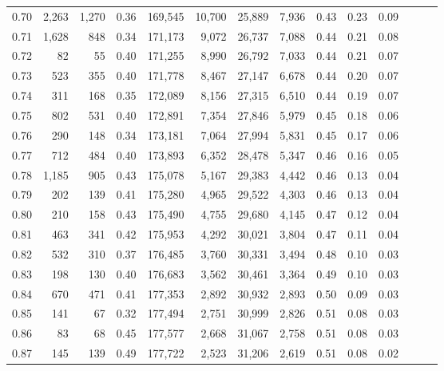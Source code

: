 \begin{tabular}{rrrrrrrrrrrrrr}
0.70 &   2,263 &  1,270 &  0.36 &  169,545 &   10,700 &  25,889 &   7,936 &  0.43 &  0.23 &      0.09 \\
0.71 &   1,628 &    848 &  0.34 &  171,173 &    9,072 &  26,737 &   7,088 &  0.44 &  0.21 &      0.08 \\
0.72 &      82 &     55 &  0.40 &  171,255 &    8,990 &  26,792 &   7,033 &  0.44 &  0.21 &      0.07 \\
0.73 &     523 &    355 &  0.40 &  171,778 &    8,467 &  27,147 &   6,678 &  0.44 &  0.20 &      0.07 \\
0.74 &     311 &    168 &  0.35 &  172,089 &    8,156 &  27,315 &   6,510 &  0.44 &  0.19 &      0.07 \\
0.75 &     802 &    531 &  0.40 &  172,891 &    7,354 &  27,846 &   5,979 &  0.45 &  0.18 &      0.06 \\
0.76 &     290 &    148 &  0.34 &  173,181 &    7,064 &  27,994 &   5,831 &  0.45 &  0.17 &      0.06 \\
0.77 &     712 &    484 &  0.40 &  173,893 &    6,352 &  28,478 &   5,347 &  0.46 &  0.16 &      0.05 \\
0.78 &   1,185 &    905 &  0.43 &  175,078 &    5,167 &  29,383 &   4,442 &  0.46 &  0.13 &      0.04 \\
0.79 &     202 &    139 &  0.41 &  175,280 &    4,965 &  29,522 &   4,303 &  0.46 &  0.13 &      0.04 \\
0.80 &     210 &    158 &  0.43 &  175,490 &    4,755 &  29,680 &   4,145 &  0.47 &  0.12 &      0.04 \\
0.81 &     463 &    341 &  0.42 &  175,953 &    4,292 &  30,021 &   3,804 &  0.47 &  0.11 &      0.04 \\
0.82 &     532 &    310 &  0.37 &  176,485 &    3,760 &  30,331 &   3,494 &  0.48 &  0.10 &      0.03 \\
0.83 &     198 &    130 &  0.40 &  176,683 &    3,562 &  30,461 &   3,364 &  0.49 &  0.10 &      0.03 \\
0.84 &     670 &    471 &  0.41 &  177,353 &    2,892 &  30,932 &   2,893 &  0.50 &  0.09 &      0.03 \\
0.85 &     141 &     67 &  0.32 &  177,494 &    2,751 &  30,999 &   2,826 &  0.51 &  0.08 &      0.03 \\
0.86 &      83 &     68 &  0.45 &  177,577 &    2,668 &  31,067 &   2,758 &  0.51 &  0.08 &      0.03 \\
0.87 &     145 &    139 &  0.49 &  177,722 &    2,523 &  31,206 &   2,619 &  0.51 &  0.08 &      0.02 \\

\end{tabular}
